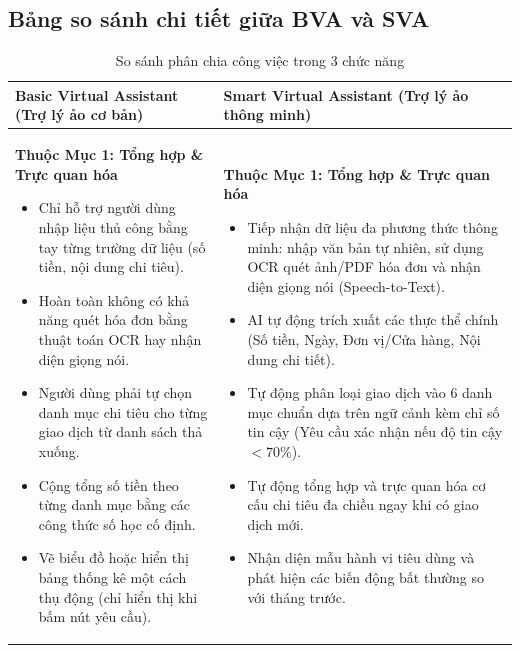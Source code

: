 \documentclass[11pt, a4paper]{article}
\begin{document}
\subsection*{Bảng so sánh chi tiết giữa BVA và SVA}

\small
\begin{longtable}{p{7.5cm} p{8.5cm}}
\caption{So sánh phân chia công việc trong 3 chức năng} \\
\toprule
\rowcolor{tableheader}
\textbf{Basic Virtual Assistant (Trợ lý ảo cơ bản)} & \textbf{Smart Virtual Assistant (Trợ lý ảo thông minh)} \\
\midrule
\endhead

\bottomrule
\endfoot

\textbf{Thuộc Mục 1: Tổng hợp \& Trực quan hóa}
\begin{itemize}
    \item Chỉ hỗ trợ người dùng nhập liệu thủ công bằng tay từng trường dữ liệu (số tiền, nội dung chi tiêu).
    \item Hoàn toàn không có khả năng quét hóa đơn bằng thuật toán OCR hay nhận diện giọng nói.
    \item Người dùng phải tự chọn danh mục chi tiêu cho từng giao dịch từ danh sách thả xuống.
    \item Cộng tổng số tiền theo từng danh mục bằng các công thức số học cố định.
    \item Vẽ biểu đồ hoặc hiển thị bảng thống kê một cách thụ động (chỉ hiển thị khi bấm nút yêu cầu).
\end{itemize}
& 
\textbf{Thuộc Mục 1: Tổng hợp \& Trực quan hóa}
\begin{itemize}
    \item Tiếp nhận dữ liệu đa phương thức thông minh: nhập văn bản tự nhiên, sử dụng OCR quét ảnh/PDF hóa đơn và nhận diện giọng nói (Speech-to-Text).
    \item AI tự động trích xuất các thực thể chính (Số tiền, Ngày, Đơn vị/Cửa hàng, Nội dung chi tiết).
    \item Tự động phân loại giao dịch vào 6 danh mục chuẩn dựa trên ngữ cảnh kèm chỉ số tin cậy (Yêu cầu xác nhận nếu độ tin cậy $< 70\%$).
    \item Tự động tổng hợp và trực quan hóa cơ cấu chi tiêu đa chiều ngay khi có giao dịch mới.
    \item Nhận diện mẫu hành vi tiêu dùng và phát hiện các biến động bất thường so với tháng trước.
\end{itemize} \\
\hline


\end{longtable}
\end{document}
